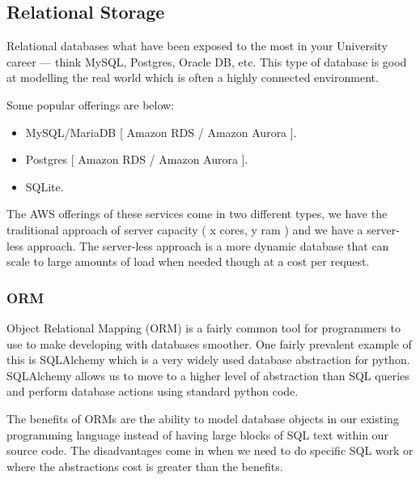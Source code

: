 \documentclass{csse4400}
\begin{document}

\subsection{Relational Storage}

Relational databases what have been exposed to the most in your University career --- think MySQL, Postgres, Oracle DB, etc.
This type of database is good at modelling the real world which is often a highly connected environment.

Some popular offerings are below:

\begin{itemize}
  \item MySQL/MariaDB [ Amazon RDS / Amazon Aurora ].
  \item Postgres [ Amazon RDS / Amazon Aurora ].
  \item SQLite.
\end{itemize}

The AWS offerings of these services come in two different types, we have the traditional approach of
server capacity ( x cores, y ram ) and we have a server-less approach.
The server-less approach is a more dynamic
database that can scale to large amounts of load when needed though at a cost per request.

  \subsubsection{ORM}
  Object Relational Mapping (ORM) is a fairly common tool for programmers to use to make developing with databases smoother.
  One fairly prevalent example of this is SQLAlchemy which is a very widely used 
  database abstraction for python.
  SQLAlchemy allows us to move to a higher level of abstraction than SQL queries and perform database actions using standard python code.

  The benefits of ORMs are the ability to model database objects in our existing programming language instead of having large blocks of SQL text within our source code.
  The disadvantages come in when we need to do specific SQL work or where the abstractions cost is greater than the benefits.
\end{document}
